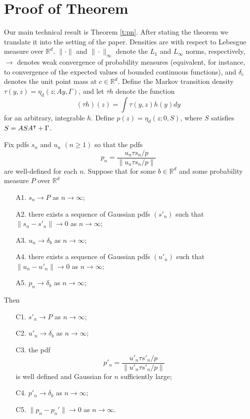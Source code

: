 \section{Proof of Theorem} 
Our main technical result is Theorem \ref{t:pn}. After stating the theorem we translate it into the setting of the paper. Densities are with respect to Lebesgue measure over $\mathbb{R}^d$. $\|\cdot\|$ and $\|\cdot\|_\infty$ denote the $L_1$ and $L_\infty$ norms, respectively, $\to$ denotes weak convergence of probability measures (equivalent, for instance, to convergence of the expected values of bounded continuous functions), and $\delta_c$ denotes the unit point mass at $c\in\mathbb{R}^d$.  Define the Markov transition density $\tau(y,z)=\eta_d(z;Ay,\Gamma)$, and let $\tau h$ denote the function
\[ (\tau h)(z) = \int \tau(y,z) h(y) dy \]
for an arbitrary, integrable $h$. Define $p(z)=\eta_d(z;0,S)$, where $S$ satisfies $S=ASA^\intercal+\Gamma$. 
\begin{theorem} \label{t:pn}
 Fix pdfs $s_n$ and $u_n$ $(n\geq 1)$ so that the pdfs
\begin{equation} \label{e:pn-BF2} p_n = \frac{u_n\tau s_n/p}{\|u_n\tau s_n/p\|}  \end{equation}
are well-defined for each $n$. Suppose that for some $b\in\mathbb{R}^d$ and some probability measure $P$ over $\mathbb{R}^d$
\begin{enumerate}
\item[A1.] $s_n \to P$ as $n\to\infty$;
\item[A2.] there exists a sequence of Gaussian pdfs $(s'_n)$ such that $\|s_n-s'_n\|\to 0$ as $n\to\infty$;
\item[A3.] $u_n \to \delta_b$ as $n\to\infty$;
\item[A4.] there exists a sequence of Gaussian pdfs $(u'_n)$ such that $\|u_n-u'_n\|\to 0$ as $n\to\infty$;
\item[A5.] $p_n \to \delta_b$ as $n\to\infty$;
\end{enumerate}
Then
\begin{enumerate}
\item[C1.] $s'_n \to P$ as $n\to\infty$;
\item[C2.] $u'_n \to \delta_b$ as $n\to\infty$;
\item[C3.] the pdf
\[ p'_n = \frac{u'_n\tau s'_n/p}{\|u'_n\tau s'_n/p\|} \]
is well defined and Gaussian for $n$ sufficiently large;
\item[C4.] $p'_n \to \delta_b$ as $n\to\infty$;
\item[C5.] $\|p_n-p_n'\|\to 0$ as $n\to\infty$.
\end{enumerate}
\end{theorem}


